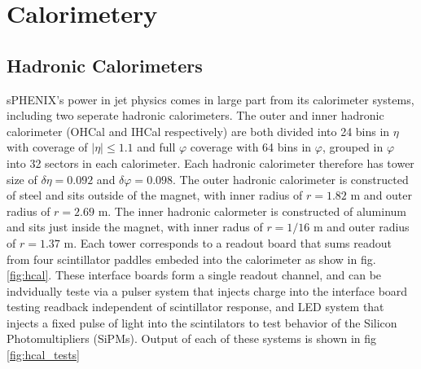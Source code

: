 \documentclass[letterpaper, 12pt, oneside]{book}
\theoremstyle{definition}
\begin{document}
\section{Calorimetery}
	\subsection{Hadronic Calorimeters}
		sPHENIX's power in jet physics comes in large part from its calorimeter systems, including two seperate hadronic calorimeters. 
		The outer and inner hadronic calorimeter (OHCal and IHCal respectively) are both divided into 24 bins in $\eta$ with coverage of $|\eta| \leq 1.1$  and full $\varphi$ coverage with 64 bins in $\varphi$, grouped in $\varphi$ into 32 sectors in each calorimeter. 
		Each hadronic calorimeter therefore has tower size of $\delta \eta = 0.092$ and $\delta \varphi=0.098$.  
		The outer hadronic calorimeter is constructed of steel and sits outside of the magnet, with inner radius of $r=1.82$ m and outer radius of $r=2.69$ m. 
		The inner hadronic calormeter is constructed of aluminum and sits just inside the magnet, with inner radus of $r=1/16$ m and outer radius of $r=1.37$ m. 
		Each tower corresponds to a readout board that sums readout from four scintillator paddles embeded into the calorimeter as show in fig. \ref{fig:hcal}. 
		These interface boards form a single readout channel, and can be indvidually teste via a pulser system that injects charge into the interface board testing readback independent of scintillator response, and LED system that injects a fixed pulse of light into the scintilators to test behavior of the Silicon Photomultipliers (SiPMs). 
		Output of each of these systems is shown in fig \ref{fig:hcal_tests}
\end{document}
